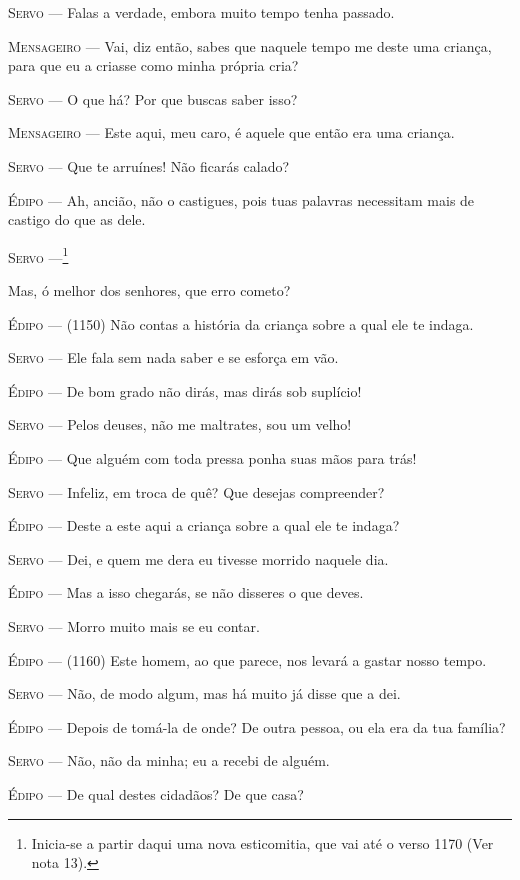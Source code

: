 \textsc{Servo} --- Falas a verdade, embora muito tempo tenha passado.

\textsc{Mensageiro} --- Vai, diz então, sabes que naquele tempo me deste uma criança, para que
eu a criasse como minha própria cria?

\textsc{Servo} --- O que há? Por que buscas saber isso?

\textsc{Mensageiro} --- Este aqui, meu caro, é aquele que então era uma criança.

\textsc{Servo} --- Que te arruínes! Não ficarás calado?

\textsc{Édipo} --- Ah, ancião, não o castigues, pois tuas palavras necessitam mais de
castigo do que as dele.

\textsc{Servo} ---\footnote{Inicia-se a partir daqui uma nova esticomitia,
  que vai até o verso 1170 (Ver nota 13).}

Mas, ó melhor dos senhores, que erro cometo?

\textsc{Édipo} --- (1150) Não contas a história da criança sobre a qual ele te indaga.

\textsc{Servo} --- Ele fala sem nada saber e se esforça em vão.

\textsc{Édipo} --- De bom grado não dirás, mas dirás sob suplício!

\textsc{Servo} --- Pelos deuses, não me maltrates, sou um velho!

\textsc{Édipo} --- Que alguém com toda pressa ponha suas mãos para trás!

\textsc{Servo} --- Infeliz, em troca de quê? Que desejas compreender?

\textsc{Édipo} --- Deste a este aqui a criança sobre a qual ele te indaga?

\textsc{Servo} --- Dei, e quem me dera eu tivesse morrido naquele dia.

\textsc{Édipo} --- Mas a isso chegarás, se não disseres o que deves.

\textsc{Servo} --- Morro muito mais se eu contar.

\textsc{Édipo} --- (1160) Este homem, ao que parece, nos levará a gastar nosso tempo.

\textsc{Servo} --- Não, de modo algum, mas há muito já disse que a dei.

\textsc{Édipo} --- Depois de tomá-la de onde? De outra pessoa, ou ela era da tua família?

\textsc{Servo} --- Não, não da minha; eu a recebi de alguém.

\textsc{Édipo} --- De qual destes cidadãos? De que casa?

